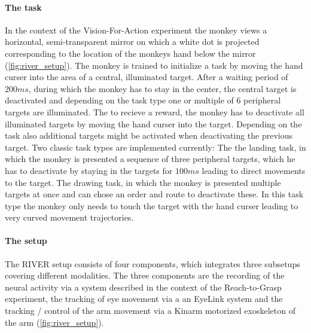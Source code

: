 \paragraph{The task}
In the context of the Vision-For-Action experiment the monkey views a horizontal, semi-transparent mirror on which a white dot is projected corresponding to the location of the monkeys hand below the mirror (\cref{fig:river_setup}). The monkey is trained to initialize a task by moving the hand curser into the area of a central, illuminated target. After a waiting period of $200ms$, during which the monkey has to stay in the center, the central target is deactivated and depending on the task type one or multiple of 6 peripheral targets are illuminated. The to recieve a reward, the monkey has to deactivate all illuminated targets by moving the hand curser into the target. Depending on the task also additional targets might be activated when deactivating the previous target. Two classic task types are implemented currently: The the landing task, in which the monkey is presented a sequence of three peripheral targets, which he has to deactivate by staying in the targets for $100ms$ leading to direct movements to the target. The drawing task, in which the monkey is presented multiple targets at once and can chose an order and route to deactivate these. In this task type the monkey only needs to touch the target with the hand curser leading to very curved movement trajectories. 


\paragraph{The setup}
The RIVER setup consists of four components, which integrates three subsetups covering different modalities. The three components are the recording of the neural activity via a  system described in the context of the Reach-to-Grasp experiment, the tracking of eye movement via a an EyeLink system and the tracking / control of the arm movement via a Kinarm motorized exoskeleton of the arm (\cref{fig:river_setup}).

